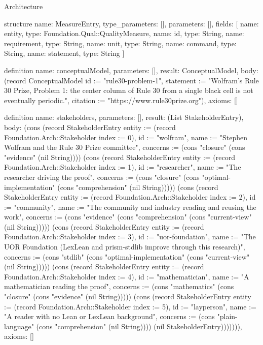 \begin{lexlean}{Architecture}
\begin{semanticmodule}
structure{
  name: MeasureEntry,
  type_parameters: [],
  parameters: [],
  fields: [
    {name: entity, type: Foundation.Qual::QualityMeasure},
    {name: id, type: String},
    {name: requirement, type: String},
    {name: unit, type: String},
    {name: command, type: String},
    {name: statement, type: String}
  ]
}

definition{
  name: conceptualModel,
  parameters: [],
  result: ConceptualModel,
  body: (record ConceptualModel {id := "rule30-problem-1", statement := "Wolfram's Rule 30 Prize, Problem 1: the center column of Rule 30 from a single black cell is not eventually periodic.", citation := "https://www.rule30prize.org"}),
  axioms: []
}

definition{
  name: stakeholders,
  parameters: [],
  result: (List StakeholderEntry),
  body: (cons (record StakeholderEntry {entity := (record Foundation.Arch::Stakeholder {index := 0}), id := "wolfram", name := "Stephen Wolfram and the Rule 30 Prize committee", concerns := (cons "closure" (cons "evidence" (nil String)))}) (cons (record StakeholderEntry {entity := (record Foundation.Arch::Stakeholder {index := 1}), id := "researcher", name := "The researcher driving the proof", concerns := (cons "closure" (cons "optimal-implementation" (cons "comprehension" (nil String))))}) (cons (record StakeholderEntry {entity := (record Foundation.Arch::Stakeholder {index := 2}), id := "community", name := "The community and industry reading and reusing the work", concerns := (cons "evidence" (cons "comprehension" (cons "current-view" (nil String))))}) (cons (record StakeholderEntry {entity := (record Foundation.Arch::Stakeholder {index := 3}), id := "uor-foundation", name := "The UOR Foundation (LexLean and prism-stdlib improve through this research)", concerns := (cons "stdlib" (cons "optimal-implementation" (cons "current-view" (nil String))))}) (cons (record StakeholderEntry {entity := (record Foundation.Arch::Stakeholder {index := 4}), id := "mathematician", name := "A mathematician reading the proof", concerns := (cons "mathematics" (cons "closure" (cons "evidence" (nil String))))}) (cons (record StakeholderEntry {entity := (record Foundation.Arch::Stakeholder {index := 5}), id := "layperson", name := "A reader with no Lean or LexLean background", concerns := (cons "plain-language" (cons "comprehension" (nil String)))}) (nil StakeholderEntry))))))),
  axioms: []
}


\end{semanticmodule}
\end{lexlean}
